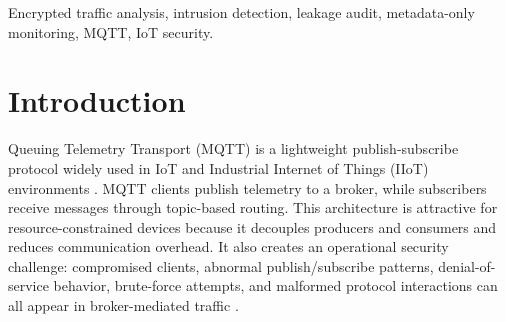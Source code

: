 \documentclass[lettersize,journal]{IEEEtran}
\begin{document}
\begin{abstract}
MQTT-based Internet of Things (IoT) deployments require intrusion detection mechanisms that remain useful when payload inspection is unavailable. Payload encryption, Transport Layer Security (TLS), and privacy constraints make payload-, topic-, credential-, and client-identifier-based intrusion detection difficult to justify in operational monitoring. This paper presents LAM-MQTT, a leakage-audited metadata-only evaluation framework for encrypted MQTT intrusion detection. The framework separates hard leakage fields from legitimate encrypted-flow metadata and evaluates audited, conservative, and common cross-dataset feature policies on MQTTEEB-D, MQTT-IoT-IDS2020, and IoT-23. The results show that encrypted-flow metadata supports effective within-dataset detection: MQTT-IoT-IDS2020 audited metadata reaches 0.9991 Macro F1, conservative sensitivity reduces this result to 0.9684, and MQTTEEB-D strict 5~s flow-window metadata reaches 0.8925. However, MQTT-to-MQTT transfer is asymmetric and window-dependent, and IoT-23 external robustness remains modest. Metadata-only IDS is therefore useful under cryptographic observability constraints, but it is not a replacement for cryptographic authentication, access control, or protocol hardening.
\end{abstract}

\begin{IEEEkeywords}
Encrypted traffic analysis, intrusion detection, leakage audit, metadata-only monitoring, MQTT, IoT security.
\end{IEEEkeywords}

\section{Introduction}
\label{sec:introduction}
 Queuing Telemetry Transport (MQTT) is a lightweight publish-subscribe protocol widely used in IoT and Industrial Internet of Things (IIoT) environments \cite{mqtt5,sisinni2018industrial}. MQTT clients publish telemetry to a broker, while subscribers receive messages through topic-based routing. This architecture is attractive for resource-constrained devices because it decouples producers and consumers and reduces communication overhead. It also creates an operational security challenge: compromised clients, abnormal publish/subscribe patterns, denial-of-service behavior, brute-force attempts, and malformed protocol interactions can all appear in broker-mediated traffic \cite{hindy2020mqttiot,mqtteebd2025}.
\end{document}
